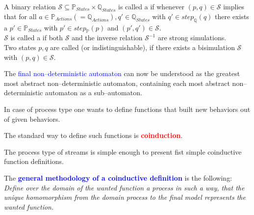 \documentclass[landscape, autoslides, light]{mmiss}
\begin{document}
\begin{Package}[Label={FSDPT}, Title={Formal Specification of Data and Process Types}, ShortTitle={FSDPT}, Authors={Horst Reichel}, Date={February 2003}, LevelOfDetail=Lecture, Language=en-GB]
\begin{Section}[Title={Final Coalgebras as Process Types}, Label={section4}]
\begin{Section}[Title={Examples of Process Types}, Label={section4_2}]
\begin{Paragraph}[Title={Bisimulation}, Label=Paragraph118]
\begin{Definition}[Label=DefBisimulation,Title=Bisimulation]
A binary relation $ \mathcal{S} \subseteq \mathbb{P}_{States}
\times \mathbb{Q}_{States}$ is called a  if whenever $(p,q) \in \mathcal{S}$ implies that for
all $a \in \mathbb{P}_{Actions} (= \mathbb{Q}_{Actions}), q' \in
\mathbb{Q}_{States}$ with $q' \in step_{\mathbb{Q}}(q)$ there
exists a $p'\in \mathbb{P}_{States}$ with $p' \in
step_{\mathbb{P}}(p)$ and $(p',q') \in \mathcal{S}$.\\ \pause
$\mathcal{S}$ is called a  if both
$\mathcal{S}$ and the inverse relation $\mathcal{S}^{-1}$ are
strong simulations.\\ \pause Two states $p, q$ are called
 (or indistinguishable), if there exists a
bisimulation $ \mathcal{S}$ with $(p,q) \in \mathcal{S}$.
\end{Definition}

\end{Paragraph}
\begin{Paragraph}[Title={Nondeterminism}, Label=Paragraph119]

The \textcolor{blue}{final non--deterministic automaton} can now
be understood as the greatest most abstract non--deterministic
automaton, containing each most abstract non--deterministic
automaton as a sub--automaton.

\end{Paragraph}
\end{Section}
\begin{Section}[Title={Coinduction}, Label={section4_3}]
\begin{Paragraph}

\small
In case of process type one wants to define functions that built
new behaviors out of given behaviors.\pause \vspace{8mm}

The standard way to define such functions is
\textcolor{red}{\textbf{coinduction}}. \pause \vspace{8mm}

The process type of streams is simple enough to present  fist
simple coinductive function definitions.\pause \vspace{8mm}

The \textcolor{blue}{\textbf{general methodology of a coinductive
definition}} is the following: \\ \pause \emph{Define over the
domain of the wanted function a process in such a way, that the
unique homomorphism from the domain process to the final model
represents the wanted function.}


\end{Paragraph}
\end{Section}
\end{Section}
\end{Package}
\end{document}
